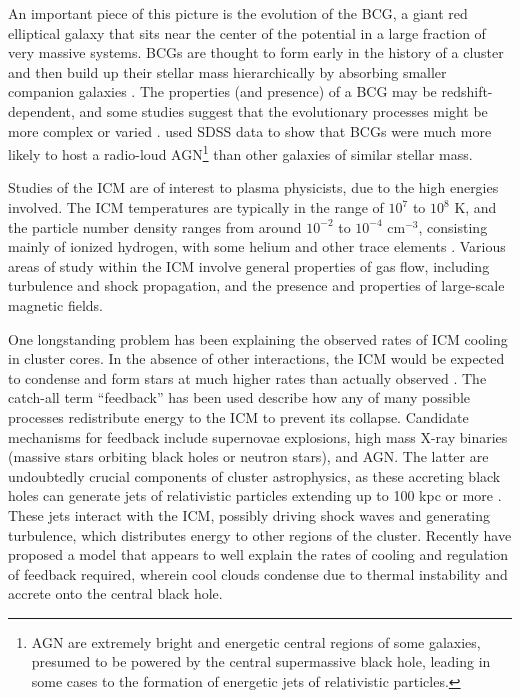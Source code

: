 An important piece of this picture is the evolution of the \ac{BCG}, a giant red elliptical galaxy that sits near the center of the potential in a large fraction of very massive systems. \ac{BCG}s are thought to form early in the history of a cluster and then build up their stellar mass hierarchically by absorbing smaller companion galaxies \citep{DeLucia07}. The properties (and presence) of a \ac{BCG} may be redshift-dependent, and some studies suggest that the evolutionary processes might be more complex or varied \citep{Oliva15}. \citet{Best07} used \ac{SDSS} data to show that \ac{BCG}s were much more likely to host a radio-loud \ac{AGN}\footnote{\ac{AGN} are extremely bright and energetic central regions of some galaxies, presumed to be powered by the central supermassive black hole, leading in some cases to the formation of energetic jets of relativistic particles.} than other galaxies of similar stellar mass.

Studies of the \ac{ICM} are of interest to plasma physicists, due to the high energies involved. The \ac{ICM} temperatures are typically in the range of $10^7$ to $10^8$ K, and the particle number density ranges from around $10^{-2}$ to $10^{-4}$ cm$^{-3}$, consisting mainly of ionized hydrogen, with some helium and other trace elements \citep{Markevitch07}. Various areas of study within the \ac{ICM} involve general properties of gas flow, including turbulence and shock propagation, and the presence and properties of large-scale magnetic fields. 

One longstanding problem has been explaining the observed rates of \ac{ICM} cooling in cluster cores. In the absence of other interactions, the \ac{ICM} would be expected to condense and form stars at much higher rates than actually observed \citep{Fabian94}. The catch-all term ``feedback'' has been used describe how any of many possible processes redistribute energy to the \ac{ICM} to prevent its collapse. Candidate mechanisms for feedback include supernovae explosions, high mass X-ray binaries (massive stars orbiting black holes or neutron stars), and \ac{AGN}. The latter are undoubtedly crucial components of cluster astrophysics, as these accreting black holes can generate jets of relativistic particles extending up to 100 kpc or more \citep{Fabian12}. These jets interact with the \ac{ICM}, possibly driving shock waves and generating turbulence, which distributes energy to other regions of the cluster. Recently \citet{Voit15} have proposed a model that appears to well explain the rates of cooling and regulation of feedback required, wherein cool clouds condense due to thermal instability and accrete onto the central black hole.

